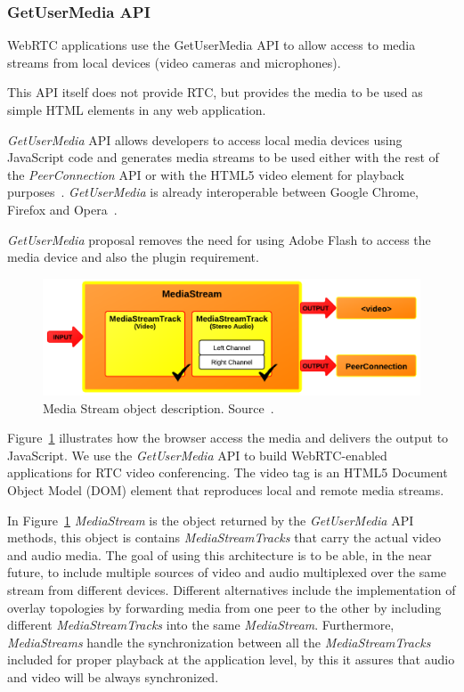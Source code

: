 \subsubsection{GetUserMedia API}
\label{sec:gum}

WebRTC applications use the GetUserMedia API to allow access to media streams from local devices (video cameras and microphones). 

This API itself does not provide RTC, but provides the media to be used as simple HTML elements in any web application. 

{\it GetUserMedia} API allows developers to access local media devices using JavaScript code and generates media streams to be used either with the rest of the {\it PeerConnection} API or with the HTML5 video element for playback purposes~\cite{getusermediaDraft}. {\it GetUserMedia} is already interoperable between Google Chrome, Firefox and Opera~\cite{chromefirefoxinterop}.

{\it GetUserMedia} proposal removes the need for using Adobe Flash to access the media device and also the plugin requirement.

 \begin{figure}[h]
  \centering
    \includegraphics[scale=1]{./figures/mediastreamAPI.png}
      \caption[Media Stream object description. Source ~\cite{getusermediaDraft}]{Media Stream object description. Source~\cite{getusermediaDraft}.}
	\label{fig:mediastreamAPI}
\end{figure}

Figure~\ref{fig:mediastreamAPI} illustrates how the browser access the media and delivers the output to JavaScript. We use the {\it GetUserMedia} API to build WebRTC-enabled applications for RTC video conferencing. The video tag is an HTML5 Document Object Model (DOM)  element that reproduces local and remote media streams.

In Figure~\ref{fig:mediastreamAPI} {\it MediaStream} is the object returned by the {\it GetUserMedia} API methods, this object is contains {\it MediaStreamTracks} that carry the actual video and audio media. The goal of using this architecture is to be able, in the near future, to include multiple sources of video and audio multiplexed over the same stream from different devices. Different alternatives include the implementation of overlay topologies by forwarding media from one peer to the other by including different {\it MediaStreamTracks} into the same {\it MediaStream}. Furthermore, {\it MediaStreams} handle the synchronization between all the {\it MediaStreamTracks} included for proper playback at the application level, by this it assures that audio and video will be always synchronized.

